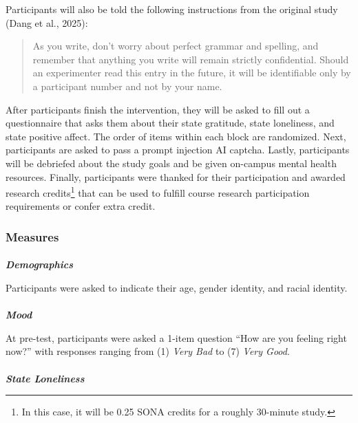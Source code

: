 \documentclass[
  letterpaper,
  DIV=11,
  numbers=noendperiod]{scrartcl}
\makeatletter
\let\oldparagraph\paragraph
\renewcommand{\paragraph}{
    \@ifstar
      \xxxParagraphStar
      \xxxParagraphNoStar
  }
\newcommand{\xxxParagraphStar}[1]{\oldparagraph*{#1}\mbox{}}
\newcommand{\xxxParagraphNoStar}[1]{\oldparagraph{#1}\mbox{}}
\makeatother
\begin{document}
Participants will also be told the following instructions from the
original study (Dang et al., 2025):

\begin{quote}
As you write, don’t worry about perfect grammar and spelling, and remember that anything you write will remain strictly confidential. Should an experimenter read this entry in the future, it will be identifiable only by a participant number and not by your name.
\end{quote}

After participants finish the intervention, they will be asked to fill
out a questionnaire that asks them about their state gratitude, state
loneliness, and state positive affect. The order of items within each
block are randomized. Next, participants are asked to pass a prompt
injection AI captcha. Lastly, participants will be debriefed about the
study goals and be given on-campus mental health resources. Finally,
participants were thanked for their participation and awarded research
credits\footnote{In this case, it will be 0.25 SONA credits for a
  roughly 30-minute study.} that can be used to fulfill course research
participation requirements or confer extra credit.

\subsubsection{Measures}\label{measures}

\paragraph{\texorpdfstring{\textbf{\emph{Demographics}}}{Demographics}}\label{demographics}

Participants were asked to indicate their age, gender identity, and
racial identity.

\paragraph{\texorpdfstring{\textbf{\emph{Mood}}}{Mood}}\label{mood}

At pre-test, participants were asked a 1-item question ``How are you
feeling right now?'' with responses ranging from (1) \emph{Very Bad} to
(7) \emph{Very Good}.

\paragraph{\texorpdfstring{\textbf{\emph{State
Loneliness}}}{State Loneliness}}\label{state-loneliness}
\end{document}
